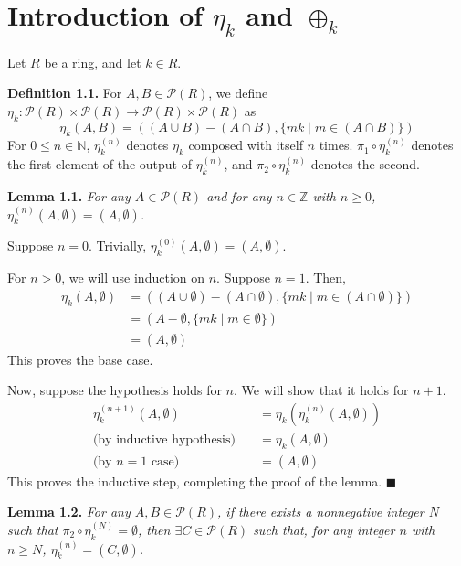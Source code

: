 \documentclass{article}
\newcommand{\zee}{\mathbb{Z}}
\newcommand{\N}{\mathbb{N}}
\begin{document}
\section{Introduction of $\eta_k$ and $\oplus_k$}

Let $R$ be a ring, and let $k \in R$.

\textbf{Definition 1.1.} For $A, B \in \mathcal{P}(R)$, we define
$\eta_k: \mathcal{P}(R) \times \mathcal{P}(R)
\rightarrow \mathcal{P}(R) \times \mathcal{P}(R)$ as
\[\eta_k(A, B) = ((A \cup B) - (A \cap B), \{mk \mid m \in (A \cap B)\})\]
For $0 \leq n \in \N$, $\eta_k^{(n)}$ denotes $\eta_k$ composed
with itself $n$ times. $\pi_1 \circ \eta_k^{(n)}$ denotes the first
element of the output of $\eta_k^{(n)}$, and $\pi_2 \circ \eta_k^{(n)}$
denotes the second.

\textbf{Lemma 1.1.} \textit{
    For any $A \in \mathcal{P}(R)$ and for any $n \in \zee$
    with $n \geq 0$,
    $\eta_k^{(n)}(A, \emptyset) = (A, \emptyset)$.
}

Suppose $n = 0$. Trivially,
$\eta_k^{(0)}(A, \emptyset) = (A, \emptyset)$.

For $n > 0$, we will use induction on $n$.
Suppose $n = 1$. Then,
\[\begin{split}
    \eta_k(A, \emptyset)
    &= ((A \cup \emptyset) - (A \cap \emptyset),
    \{mk \mid m \in (A \cap \emptyset)\}) \\
    &= (A - \emptyset, \{mk \mid m \in \emptyset\}) \\
    &= (A, \emptyset)
\end{split}\]
This proves the base case.

Now, suppose the hypothesis holds
for $n$. We will show that it holds for $n+1$.
\[\begin{split}
    \eta_k^{(n+1)}(A, \emptyset)
    &= \eta_k(\eta_k^{(n)}(A, \emptyset)) \\
    \text{(by inductive hypothesis)}\quad
    &= \eta_k(A, \emptyset) \\
    \text{(by $n=1$ case)}\quad
    &= (A, \emptyset)
\end{split}\]
This proves the inductive step, completing the proof of the
lemma. $\blacksquare$

\textbf{Lemma 1.2.} \textit{
    For any $A, B \in \mathcal{P}(R)$, if there exists a
    nonnegative integer $N$ such that
    $\pi_2 \circ \eta_k^{(N)} = \emptyset$,
    then $\exists C \in \mathcal{P}(R)$ such that,
    for any integer $n$ with $n \geq N$,
    $\eta_k^{(n)} = (C, \emptyset)$.
}
\end{document}
